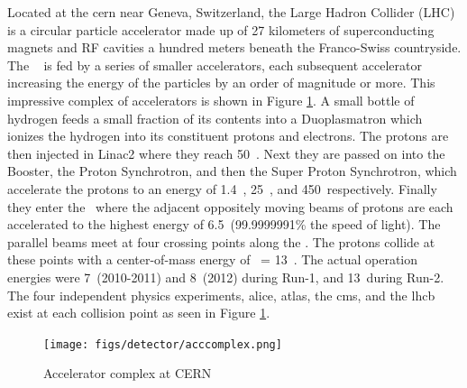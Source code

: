 Located at the \gls{cern} near Geneva, Switzerland, the Large Hadron Collider (LHC) \cite{2008.LHC} is a circular particle accelerator made up of 27 kilometers of superconducting magnets and RF cavities a hundred meters beneath the Franco-Swiss countryside.
The \lhc~ is fed by a series of smaller accelerators, each subsequent accelerator increasing the energy of the particles by an order of magnitude or more.
This impressive complex of accelerators is shown in Figure \ref{fig:detector:lhc}.
A small bottle of hydrogen feeds a small fraction of its contents into a Duoplasmatron which ionizes the hydrogen into its constituent protons and electrons.
The protons are then injected in Linac2 where they reach 50~\MeV.
Next they are passed on into the Booster, the Proton Synchrotron, and then the Super Proton Synchrotron, which accelerate the protons to an energy of 1.4~\GeV, 25~\GeV, and 450~\GeV respectively.
Finally they enter the \lhc\ where the adjacent oppositely moving beams of protons are each accelerated to the highest energy of 6.5~\TeV (99.9999991\% the speed of light).
The parallel beams meet at four crossing points along the \lhc.
The protons collide at these points with a center-of-mass energy of \rts\ = 13~\tev.
The actual operation energies were 7~\TeV (2010-2011) and 8~\TeV (2012) during Run-1, and 13~\TeV during Run-2.
The four independent physics experiments, \gls{alice}\cite{ALICE:2008ngc}, \gls{atlas}\cite{PERF-2007-01}, the \gls{cms}\cite{CMS:2008xjf}, and the \gls{lhcb}\cite{LHCb:2008vvz} exist at each collision point as seen in Figure \ref{fig:detector:lhc}.
\begin{figure}[h]
  \begin{center}
    \texttt{[image: figs/detector/acccomplex.png]}
  \end{center}
  \caption[Accelerator complex at CERN]
          {Accelerator complex at CERN~\cite{Mobs:2197559}}
  \label{fig:detector:lhc}
\end{figure}

